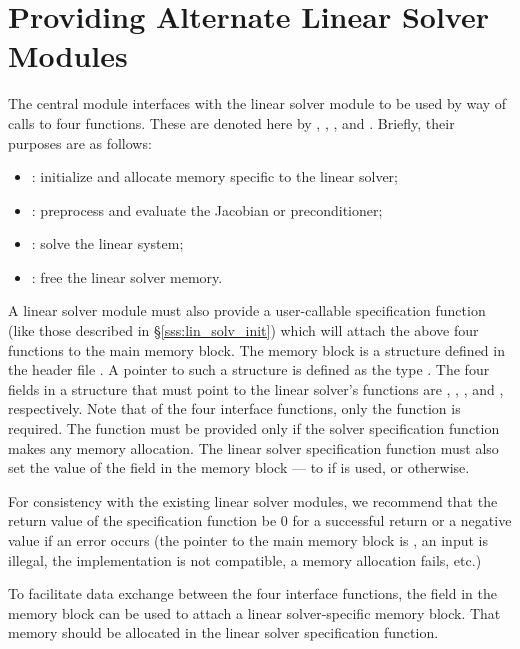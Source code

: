 \chapter{Providing Alternate Linear Solver Modules}\label{s:new_linsolv}
The central {\cvodes} module interfaces with the linear solver module to be
used by way of calls to four functions.  These are denoted here by 
, , , and .
Briefly, their purposes are as follows:
\begin{itemize}
\item {}: initialize and allocate memory specific to the
  linear solver;
\item {}: preprocess and evaluate the Jacobian or preconditioner;
\item {}: solve the linear system;
\item {}: free the linear solver memory.
\end{itemize}
A linear solver module must also provide a user-callable specification
function (like those described in \S\ref{sss:lin_solv_init}) which
will attach the above four functions to the main {\cvodes} memory block.
The {\cvodes} memory block is a structure defined in the header file
.
A pointer to such a structure is defined as the type . 
The four fields in a  structure that must point to the
linear solver's functions are , ,
, and , respectively.
Note that of the four interface functions, only the 
function is required.  The  function must be provided only
if the solver specification function makes any memory allocation.
The linear solver specification function must also set the value of
the field  in the {\cvodes} memory block --- to
 if  is used, or  otherwise.

For consistency with the existing {\cvodes} linear solver modules, we
recommend that the return value of the specification function be 0 for
a successful return or a negative value if an error occurs (the
pointer to the main {\cvodes} memory block is , an input is
illegal, the {\nvector} implementation is not compatible, a memory
allocation fails, etc.)

To facilitate data exchange between the four interface functions, the
field  in the {\cvodes} memory block can be used to
attach a linear solver-specific memory block.
That memory should be allocated in the linear solver specification function.

